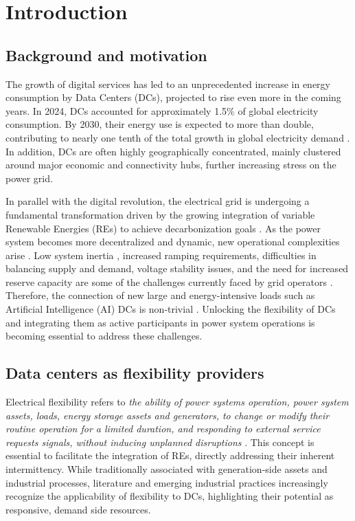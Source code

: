 \documentclass[preprint,12pt]{elsarticle}
\begin{document}
\section{Introduction}
\subsection{Background and motivation}
The growth of digital services has led to an unprecedented increase in energy consumption by Data Centers (DCs), projected to rise even more in the coming years. In 2024, DCs accounted for approximately 1.5\% of global electricity consumption. By 2030, their energy use is expected to more than double, contributing to nearly one tenth of the total growth in global electricity demand \cite{iea2025energyai}. In addition, DCs are often highly geographically concentrated, mainly clustered around major economic and connectivity hubs, further increasing stress on the power grid. 

In parallel with the digital revolution, the electrical grid is undergoing a fundamental transformation driven by the growing integration of variable Renewable Energies (REs) to achieve decarbonization goals \cite{Shair2021}. As the power system becomes more decentralized and dynamic, new operational complexities arise \cite{Caballero-Pea2022}. Low system inertia \cite{Zhang2025}, increased ramping requirements, difficulties in balancing supply and demand, voltage stability issues, and the need for increased reserve capacity are some of the challenges currently faced by grid operators \cite{Purkait2024}. Therefore, the connection of new large and energy-intensive loads such as Artificial Intelligence (AI) DCs is non-trivial \cite{AlKez2022, Jones2018, Gnibga2024}. Unlocking the flexibility of DCs and integrating them as active participants in power system operations is becoming essential to address these challenges.
\subsection{Data centers as flexibility providers}
Electrical flexibility refers to \textit{the ability of power systems operation, power system assets, loads, energy storage assets and generators, to change or modify their routine operation for a limited duration, and responding to external service requests signals, without inducing unplanned disruptions} \cite{Degefa2021}. This concept is essential to facilitate the integration of REs, directly addressing their inherent intermittency. While traditionally associated with generation-side assets and industrial processes, literature \cite{Takci2025, crozier2025potential} and emerging industrial practices \cite{Radovanovic2023} increasingly recognize the applicability of flexibility to DCs, highlighting their potential as responsive, demand side resources.
\end{document}
